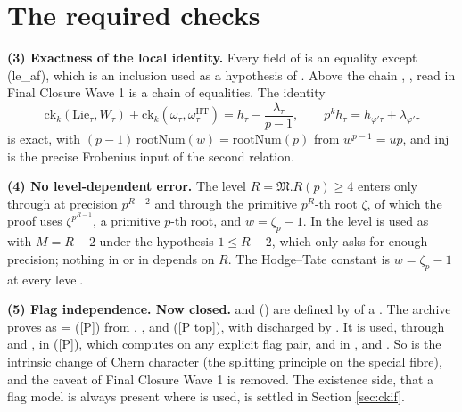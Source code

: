 \documentclass[11pt]{article}
\newcommand{\mP}{\textsf{[P]}}
\newcommand{\mPt}{\textsf{[P top]}}
\theoremstyle{remark}
\begin{document}
\section{The required checks}\label{sec:required}

\textbf{(3) Exactness of the local identity.} Every field of  is an equality except (le\_af), which is an inclusion used as a hypothesis of . Above  the chain , ,  read in Final Closure Wave 1 is a chain of equalities. The identity
\[
\mathrm{ck}_k(\mathrm{Lie}_\tau,W_\tau)+\mathrm{ck}_k(\omega_\tau,\omega^{\mathrm{HT}}_\tau)=h_\tau-\frac{\lambda_\tau}{p-1},\qquad p^kh_\tau=h_{\varphi'\tau}+\lambda_{\varphi'\tau}
\]
is exact, with $(p-1)\,\mathrm{rootNum}(w)=\mathrm{rootNum}(p)$ from $w^{p-1}=up$, and \textsf{inj} is the precise Frobenius input of the second relation.

\textbf{(4) No level-dependent error.} The level $R=\mathfrak M.R(p)\ge4$ enters  only through  at precision $p^{R-2}$ and through the primitive $p^R$-th root $\zeta$, of which the proof uses $\zeta^{p^{R-1}}$, a primitive $p$-th root, and $w=\zeta_p-1$. In  the level is used as  with $M=R-2$ under the hypothesis $1\le R-2$, which only asks for enough precision; nothing in  or in  depends on $R$. The Hodge--Tate constant is $w=\zeta_p-1$ at every level.

\textbf{(5) Flag independence. Now closed.}  and  () are defined by  of a . The archive proves  as  =  (\mP) from , ,  and  (\mPt), with  discharged by . It is used, through  and , in  (\mP), which computes  on any explicit flag pair, and in ,  and . So  is the intrinsic change of Chern character (the splitting principle on the special fibre), and the caveat of Final Closure Wave 1 is removed. The existence side, that a flag model is always present where  is used, is settled in Section \ref{sec:ckif}.
\end{document}
